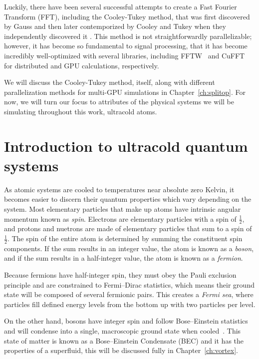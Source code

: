 Luckily, there have been several successful attempts to create a Fast Fourier Transform (FFT), including the Cooley-Tukey method, that was first discovered by Gauss and then later contemporized by Cooley and Tukey when they independently discovered it \cite{cooley1965}.
This method is not straightforwardly parallelizable; however, it has become so fundamental to signal processing, that it has become incredibly well-optimized with several libraries, including FFTW~\cite{frigo1998} and CuFFT~\cite{fatica2008} for distributed and GPU calculations, respectively.

We will discuss the Cooley-Tukey method, itself, along with different parallelization methods for multi-GPU simulations in Chapter~\ref{ch:splitop}.
For now, we will turn our focus to attributes of the physical systems we will be simulating throughout this work, ultracold atoms.

\section{Introduction to ultracold quantum systems}

As atomic systems are cooled to temperatures near absolute zero Kelvin, it becomes easier to discern their quantum properties which vary depending on the system.
Most elementary particles that make up atoms have intrinsic angular momentum known as \textit{spin}.
Electrons are elementary particles with a spin of $\frac{1}{2}$, and protons and nuetrons are made of elementary particles that sum to a spin of $\frac{1}{2}$.
The spin of the entire atom is determined by summing the constituent spin components.
If the sum results in an integer value, the atom is known as a \textit{boson}, and if the sum results in a half-integer value, the atom is known as a \textit{fermion}.

Because fermions have half-integer spin, they must obey the Pauli exclusion principle and are constrained to Fermi--Dirac statistics, which means their ground state will be composed of several fermionic pairs.
This creates a \textit{Fermi sea}, where particles fill defined energy levels from the bottom up with two particles per level.

On the other hand, bosons have integer spin and follow Bose--Einstein statistics and will condense into a single, macroscopic ground state when cooled~\cite{Einstein1925, Fetter2003}.
This state of matter is known as a Bose--Einstein Condensate (BEC) and it has the properties of a superfluid, this will be discussed fully in Chapter~\ref{ch:vortex}.

